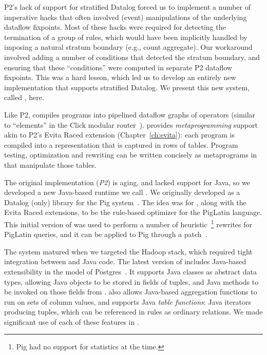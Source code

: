 P2's lack of support for stratified Datalog forced us to implement a number of
imperative hacks that often involved (event) manipulations of the underlying
dataflow fixpoints.  Most of these hacks were required for detecting the
termination of a group of rules, which would have been implicitly handled by
imposing a natural stratum boundary (e.g., count aggregate).  Our workaround
involved adding a number of conditions that detected the stratum boundary, and
ensuring that these ``conditions'' were computed in separate P2 dataflow
fixpoints.  This was a hard lesson, which led us to develop an entirely new
\OVERLOG implementation that supports stratified Datalog.  We present this new
system, called \JOL, here.

Like P2, \JOL compiles \OVERLOG programs into pipelined dataflow graphs of
operators (similar to ``elements'' in the Click modular router~\cite{click}).
\JOL provides \emph{metaprogramming} support akin to P2's Evita Raced
extension (Chapter~\ref{ch:evita}): each \OVERLOG program is compiled into a
representation that is captured in rows of tables.  Program testing,
optimization and rewriting can be written concisely as metaprograms in \OVERLOG
that manipulate those tables.

The original \OVERLOG implementation ({\em P2}) is aging, and lacked support
for Java, so we developed a new Java-based \OVERLOG runtime we call {\em \JOL.}
We originally developed \JOL as a Datalog (only) library for the Pig
system~\cite{pig-sigmod}.  The idea was for \JOL, along with the Evita Raced
extensions, to be the rule-based optimizer for the PigLatin language.  This
initial version of \JOL was used to perform a number of heuristic~\footnote{Pig
had no support for statistics at the time.} rewrites for PigLatin queries, and
it can be applied to Pig through a patch~\cite{jira-360}.

The \JOL system matured when we targeted the Hadoop stack, which required tight
integration between \OVERLOG and Java code.  The latest version of \JOL
includes Java-based extensibility in the model of Postgres~\cite{postgres}.  It
supports Java classes as abstract data types, allowing Java objects to be
stored in fields of tuples, and Java methods to be invoked on those fields from
\OVERLOG.  \JOL also allows Java-based aggregation functions to run on sets of
column values, and supports Java \emph{table functions}: Java iterators
producing tuples, which can be referenced in \OVERLOG rules as ordinary
relations.  We made significant use of each of these features in \BOOMA.


